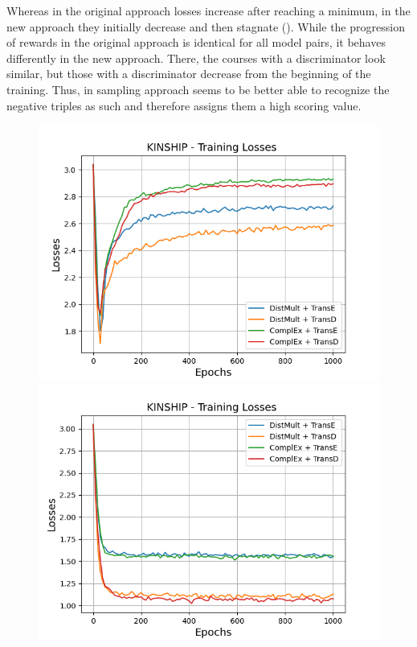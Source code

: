 Whereas in the original approach losses increase after reaching a minimum, in the new approach they initially decrease and then stagnate ().
While the progression of rewards in the original approach is identical for all model pairs, it behaves differently in the new \usgan approach.
There, the courses with a \transe discriminator look similar, but those with a \transd discriminator decrease from the beginning of the training.
Thus, in \usgan sampling approach \transd seems to be better able to recognize the negative triples as such and therefore assigns them a high scoring value.
\begin{figure}[H]
    \centering
    \begin{minipage}{.5\textwidth}
      \centering
      \includegraphics[width=0.9\linewidth]{figures/results/gan_train/not_pretrained/random/kinship/1k_epochs/random_kinship_losses.png}
    \end{minipage}%
    \begin{minipage}{.5\textwidth}
      \centering
      \includegraphics[width=0.9\linewidth]{figures/results/gan_train/not_pretrained/uncertainty/max_distribution/entropy/kinship/1k_epochs/uncertainty_kinship_losses.png}

\end{minipage}
\end{figure}
